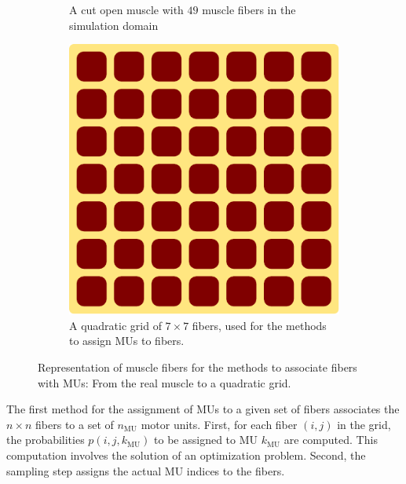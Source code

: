 \begin{figure}
\begin{subfigure}[t]{0.28\textwidth}
    \caption{A cut open muscle with $49$ muscle fibers in the simulation domain}%
    \label{fig:mu_grid1}%
  \end{subfigure}
  \quad
  \begin{subfigure}[t]{0.33\textwidth}%
    \centering%
    \includegraphics[width=\textwidth]{images/motor_unit_assignment/muscle_fibers_grid.pdf}%
    \caption{A quadratic grid of $7 \times 7$ fibers, used for the methods to assign MUs to fibers.}%
    \label{fig:mu_grid2}%
  \end{subfigure}
  \caption{Representation of muscle fibers for the methods to associate fibers with MUs: From the real muscle to a quadratic grid.}%
  \label{fig:mu_grid}%
\end{figure}%



The first method for the assignment of MUs to a given set of fibers associates the $n \times n$ fibers to a set of $n_\text{MU}$ motor units.
First, for each fiber ${(i,j)}$ in the grid, the probabilities $p(i,j,k_\text{MU})$ to be assigned to MU $k_\text{MU}$ are computed. This computation involves the solution of an optimization problem. Second, the sampling step assigns the actual MU indices to the fibers.

